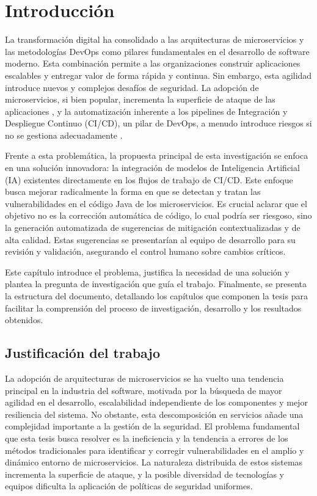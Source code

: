 \chapter{Introducción}\label{chap:introduccion}

La transformación digital ha consolidado a las arquitecturas de microservicios y las metodologías DevOps como pilares fundamentales en el desarrollo de software moderno. Esta combinación permite a las organizaciones construir aplicaciones escalables y entregar valor de forma rápida y continua. Sin embargo, esta agilidad introduce nuevos y complejos desafíos de seguridad. La adopción de microservicios, si bien popular, incrementa la superficie de ataque de las aplicaciones \cite{Zafeiropoulos2023SecurityGaps}, y la automatización inherente a los pipelines de Integración y Despliegue Continuo (CI/CD), un pilar de DevOps, a menudo introduce riesgos si no se gestiona adecuadamente \cite{NIST2024CICDSecurity}.

Frente a esta problemática, la propuesta principal de esta investigación se enfoca en una solución innovadora: la integración de modelos de Inteligencia Artificial (IA) existentes directamente en los flujos de trabajo de CI/CD. Este enfoque busca mejorar radicalmente la forma en que se detectan y tratan las vulnerabilidades en el código Java de los microservicios. Es crucial aclarar que el objetivo no es la corrección automática de código, lo cual podría ser riesgoso, sino la generación automatizada de sugerencias de mitigación contextualizadas y de alta calidad. Estas sugerencias se presentarían al equipo de desarrollo para su revisión y validación, asegurando el control humano sobre cambios críticos.

Este capítulo introduce el problema, justifica la necesidad de una solución y plantea la pregunta de investigación que guía el trabajo. Finalmente, se presenta la estructura del documento, detallando los capítulos que componen la tesis para facilitar la comprensión del proceso de investigación, desarrollo y los resultados obtenidos.

\section{Justificación del trabajo}\label{sec:justificaciontrabajo}

La adopción de arquitecturas de microservicios se ha vuelto una tendencia principal en la industria del software, motivada por la búsqueda de mayor agilidad en el desarrollo, escalabilidad independiente de los componentes y mejor resiliencia del sistema. No obstante, esta descomposición en servicios añade una complejidad importante a la gestión de la seguridad. El problema fundamental que esta tesis busca resolver es la ineficiencia y la tendencia a errores de los métodos tradicionales para identificar y corregir vulnerabilidades en el amplio y dinámico entorno de microservicios. La naturaleza distribuida de estos sistemas incrementa la superficie de ataque, y la posible diversidad de tecnologías y equipos dificulta la aplicación de políticas de seguridad uniformes.

